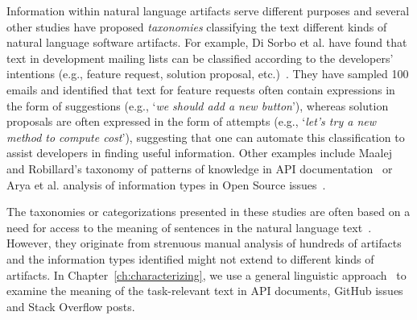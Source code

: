 Information within natural language artifacts 
serve different purposes and several other studies have
 proposed \textit{taxonomies} classifying the text 
 different kinds of natural language software artifacts.
For example, Di Sorbo et al. have found that 
text in development mailing lists can be classified according to the developers' intentions (e.g., feature request, solution proposal, etc.)~\cite{Sorbo2015}.
They have sampled 100 emails and identified that text for feature requests 
often contain expressions in the form of suggestions
(e.g., `\textit{we should add a new button}'), whereas solution proposals 
are often expressed in the form of attempts (e.g., `\textit{let's try a new method to compute cost}'),
suggesting that one can automate this classification to assist developers in finding useful information.
Other examples include Maalej and Robillard's taxonomy of patterns of knowledge in API documentation~\cite{Maalej2013}
or Arya et al. analysis of information types in Open Source issues~\cite{Arya2019}.



The taxonomies or categorizations presented in these studies are often based
on a need for access to the meaning of
sentences in the natural language text~\cite{berners2001, calero2006, witte2007}.
However, they originate from strenuous manual analysis 
of hundreds of artifacts and the information types identified 
might not extend to different kinds of artifacts.
In Chapter~\ref{ch:characterizing}, 
we use a general linguistic approach~\cite{fillmore1976frame} to
examine the meaning of the task-relevant text in 
API documents, GitHub issues and Stack Overflow posts.

